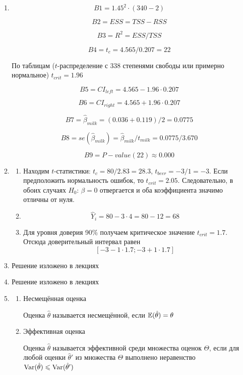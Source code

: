\documentclass[12pt, a4paper]{article}\usepackage[]{graphicx}\usepackage[]{color}
\begin{document}
\begin{enumerate}

\item
\[
B1 = 1.45^2 \cdot (340-2)
\]

\[
B2 = ESS = TSS - RSS
\]

\[
B3 = R^2 = ESS / TSS
\]

\[
B4 = t_c = 4.565 / 0.207 = 22
\]

По таблицам ($t$-распределение с 338 степенями свободы или примерно нормальное) $t_{crit} = 1.96$

\[
B5 = CI_{left} = 4.565 - 1.96 \cdot 0.207
\]


\[
B6 = CI_{right} = 4.565 + 1.96 \cdot 0.207
\]


\[
B7 = \hat \beta_{milk} = (0.036 + 0.119) /2 = 0.0775
\]

\[
B8 = se(\hat \beta_{milk}) = \hat \beta_{milk} / t_{milk} = 0.0775 / 3.670
\]

\[
B9 = P-value (22) \approx 0.000
\]


\item
\begin{enumerate}
\item
Находим $t$-статистики: $t_c = 80/2.83 = 28.3$, $t_{beer} = -3/1 = -3$. Если предположить нормальность ошибок, то $t_{crit} = 2.05$. Следовательно, в обоих случаях $H_0$: $\beta = 0$ отвергается и оба коэффициента значимо отличны от нуля.


\item
\[
\hat Y_i = 80 - 3 \cdot 4 = 80 - 12 = 68
\]

\item
Для уровня доверия 90\% получаем критическое значение $t_{crit}=1.7$. Отсюда доверительный интервал равен
\[
[-3-1\cdot 1.7;-3 + 1\cdot 1.7]
\]


\end{enumerate}


\item  Решение изложено в лекциях
\item  Решение изложено в лекциях


\item
\begin{enumerate}
\item Несмещённая оценка

Оценка $\hat \theta$ называется несмещённой, если $\mathbb{E}(\hat\theta)=\theta$

\item Эффективная оценка

Оценка $\hat \theta$ называется эффективной среди множества оценок $\Theta$, если для любой оценки $\hat \theta'$ из множества $\Theta$ выполнено неравенство $\operatorname{Var}(\hat \theta) \leqslant \operatorname{Var}(\hat \theta')$


\end{enumerate}
\end{enumerate}
\end{document}
